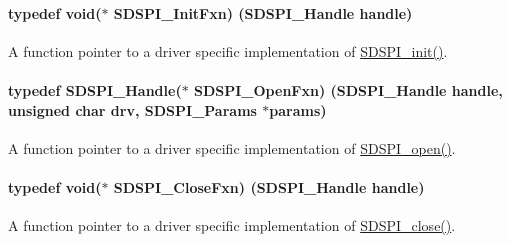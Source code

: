 \paragraph[{S\+D\+S\+P\+I\+\_\+\+Init\+Fxn}]{\setlength{\rightskip}{0pt plus 5cm}typedef void($\ast$ S\+D\+S\+P\+I\+\_\+\+Init\+Fxn) ({\bf S\+D\+S\+P\+I\+\_\+\+Handle} handle)}\label{_s_d_s_p_i_8h_af13f4dd690895ef9905b94eb35186f39}


A function pointer to a driver specific implementation of \hyperlink{_s_d_s_p_i_8h_a83cfcebe7875d9d8b5e08e57e6785ae6}{S\+D\+S\+P\+I\+\_\+init()}. 

\paragraph[{S\+D\+S\+P\+I\+\_\+\+Open\+Fxn}]{\setlength{\rightskip}{0pt plus 5cm}typedef {\bf S\+D\+S\+P\+I\+\_\+\+Handle}($\ast$ S\+D\+S\+P\+I\+\_\+\+Open\+Fxn) ({\bf S\+D\+S\+P\+I\+\_\+\+Handle} handle, unsigned char drv, {\bf S\+D\+S\+P\+I\+\_\+\+Params} $\ast$params)}\label{_s_d_s_p_i_8h_ad5e9c96037fb86b0337f0183dec6457d}


A function pointer to a driver specific implementation of \hyperlink{_s_d_s_p_i_8h_af4a5ca9bb35e8a7df02acf20ceeae66d}{S\+D\+S\+P\+I\+\_\+open()}. 

\paragraph[{S\+D\+S\+P\+I\+\_\+\+Close\+Fxn}]{\setlength{\rightskip}{0pt plus 5cm}typedef void($\ast$ S\+D\+S\+P\+I\+\_\+\+Close\+Fxn) ({\bf S\+D\+S\+P\+I\+\_\+\+Handle} handle)}\label{_s_d_s_p_i_8h_a93cc6dafba2c319c8f2662c9e109f0cd}


A function pointer to a driver specific implementation of \hyperlink{_s_d_s_p_i_8h_a8816c223935b575f10acd5277b9a8ca5}{S\+D\+S\+P\+I\+\_\+close()}. 

